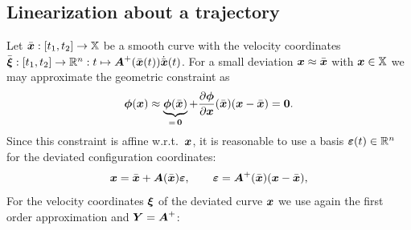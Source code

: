 \subsection{Linearization about a trajectory}\label{sec:LinAboutTraj}
Let $\sysCoordB : [t_1, t_2] \rightarrow \configSpace$ be a smooth curve with the velocity coordinates $\sysVelB : [t_1, t_2] \rightarrow \RealNum^{\dimConfigSpace} : t \mapsto \kinMat^+(\sysCoordB(t)) \sysCoordBd(t)$.
For a small deviation $\sysCoord \approx \sysCoordB$ with $\sysCoord \in \configSpace$ we may approximate the geometric constraint as
\begin{align}
 \geoConstraint(\sysCoord) \approx \underbrace{\geoConstraint(\sysCoordB)}_{=\,\tuple{0}} + \pdiff[\geoConstraint]{\sysCoord}(\sysCoordB) (\sysCoord - \sysCoordB) = \tuple{0}.
\end{align}
Since this constraint is affine w.r.t.\ $\sysCoord$, it is reasonable to use a basis $\LinErrorCoord(t) \in \RealNum^{\dimConfigSpace}$ for the deviated configuration coordinates:
\begin{align}
 \sysCoord = \sysCoordB + \kinMat(\sysCoordB) \LinErrorCoord,
\qquad
 \LinErrorCoord = \kinMat^+(\sysCoordB) (\sysCoord - \sysCoordB),
\end{align}
For the velocity coordinates $\sysVel$ of the deviated curve $\sysCoord$ we use again the first order approximation and $\kinBasisMat = \kinMat^+$:
